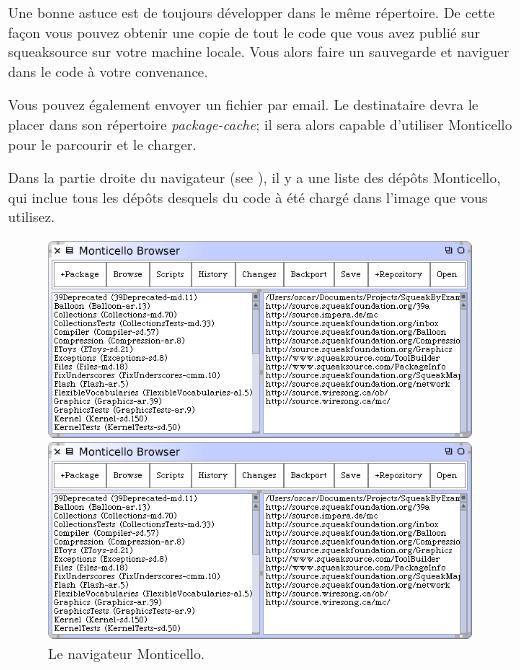 \documentclass[a4paper,10pt,twoside]{book}
\begin{document}
Une bonne astuce est de toujours développer dans le même répertoire. De cette façon vous pouvez obtenir une copie de tout le code que vous avez publié sur squeaksource sur votre machine locale. Vous alors faire un sauvegarde et naviguer dans le code à votre convenance.

Vous pouvez également envoyer un fichier  par email.
Le destinataire devra le placer dans son répertoire \emph{package-cache}; il sera alors capable d'utiliser Monticello pour le parcourir et le charger. 

Dans la partie droite du navigateur (see ), il y a une liste des dépôts Monticello, qui inclue tous les dépôts desquels du code à été chargé dans l'image que vous utilisez. 

\begin{figure}[hbt]
\ifluluelse
	{\centerline {\includegraphics[width=\textwidth]{MonticelloBrowser}}}
	{\centerline {\includegraphics[scale=0.7]{MonticelloBrowser}}}
\caption{Le navigateur Monticello.
\label{fig:monticello1}}
\end{figure}
\end{document}
